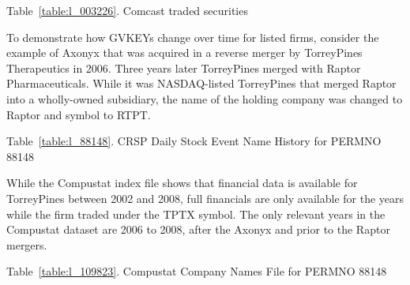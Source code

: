 \documentclass[12pt]{article}
\begin{document}
\begin{center}
Table~\ref{table:l_003226}. Comcast traded securities\label{table:l_003226}

\end{center}


To demonstrate how GVKEYs change over time for listed firms, consider the example of Axonyx that was acquired in a reverse merger by TorreyPines Therapeutics in 2006.
Three years later TorreyPines merged with Raptor Pharmaceuticals.
While it was NASDAQ-listed TorreyPines that merged Raptor into a wholly-owned subsidiary, the name of the holding company was changed to Raptor and symbol to RTPT.

\begin{center}
Table~\ref{table:l_88148}. CRSP Daily Stock Event Name History for PERMNO 88148\label{table:l_88148}

\end{center}

While the Compustat index file shows that financial data is available for TorreyPines between 2002 and 2008, full financials are only available for the years while the firm traded under the TPTX symbol.
The only relevant years in the Compustat dataset are 2006 to 2008, after the Axonyx and prior to the Raptor mergers.

\begin{center}
Table~\ref{table:l_109823}. Compustat Company Names File for PERMNO 88148\label{table:l_109823}

\end{center}
\end{document}
